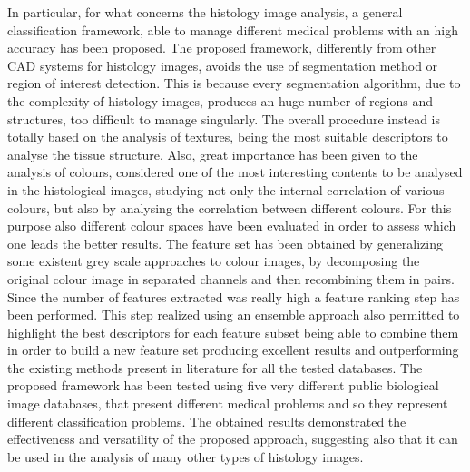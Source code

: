 \documentclass[final,a4paper,12pt,english]{UnicaPhdThesis3}
\begin{document}
In particular, for what concerns the histology image analysis, a general classification framework, able to manage different medical problems with an high accuracy has been proposed. The proposed framework, differently from other CAD systems for histology images, avoids the use of segmentation method or region of interest detection.  This is because every segmentation algorithm, due to the complexity of histology images, produces an huge number of regions and structures, too difficult to manage singularly. The overall procedure instead is totally based on the analysis of textures, being the most suitable descriptors to analyse the tissue structure. Also, great importance has been given to the analysis of colours, considered one of the most interesting contents to be analysed in the histological images, studying not only the internal correlation of various colours, but also by analysing the correlation between different colours. For this purpose also different colour spaces have been evaluated in order to assess which one leads the better results. The feature set has been obtained by generalizing  some existent grey scale approaches to colour images, by decomposing the original colour image in separated channels and then recombining them in pairs. Since the number of features extracted was really high a feature ranking step has been performed. This step realized using an ensemble approach also permitted to highlight the best descriptors for each feature subset being able to combine them in order to build a new feature set producing excellent results and outperforming the existing methods present in literature for all the tested databases. The proposed framework has been tested using five very different public biological image databases, that present different medical problems and so they represent different classification problems. The obtained results demonstrated the effectiveness and versatility of the proposed approach, suggesting also that it can be used in the analysis of many other types of histology images.
\end{document}
